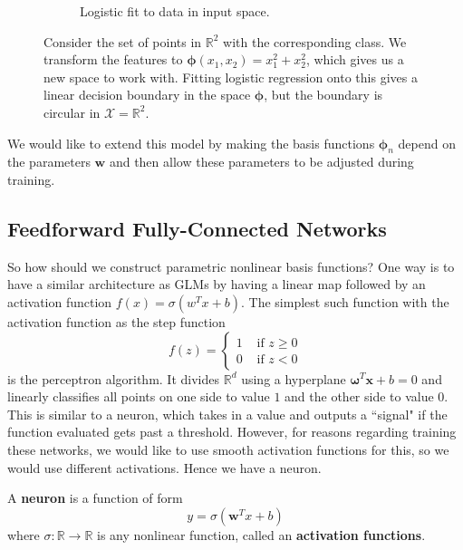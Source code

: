 \begin{figure}[H]
\begin{subfigure}[t]{0.24\textwidth}
      \caption{Logistic fit to data in input space.}
      \label{fig:raw_trained}
    \end{subfigure}
    \caption{Consider the set of points in $\mathbb{R}^2$ with the corresponding class. We transform the features to $\boldsymbol{\phi}(x_1, x_2) = x_1^2 + x_2^2$, which gives us a new space to work with. Fitting logistic regression onto this gives a linear decision boundary in the space $\boldsymbol{\phi}$, but the boundary is circular in $\mathcal{X} = \mathbb{R}^2$.}
    \label{fig:logistic_transformed}
  \end{figure}

  We would like to extend this model by making the basis functions $\boldsymbol{\phi}_n$ depend on the parameters $\mathbf{w}$ and then allow these parameters to be adjusted during training. 

\subsection{Feedforward Fully-Connected Networks}

  So how should we construct parametric nonlinear basis functions? One way is to have a similar architecture as GLMs by having a linear map followed by an activation function $f(x) = \sigma(w^T x + b)$. The simplest such function with the activation function as the step function 
  \begin{equation}
    f(z) = \begin{cases} 1 & \text{ if } z \geq 0 \\ 0 & \text{ if } z < 0 \end{cases}
  \end{equation}
  is the perceptron algorithm. It divides $\mathbb{R}^d$ using a hyperplane $\boldsymbol{\omega}^T \mathbf{x} + b = 0$ and linearly classifies all points on one side to value $1$ and the other side to value $0$. This is similar to a neuron, which takes in a value and outputs a ``signal" if the function evaluated gets past a threshold. However, for reasons regarding training these networks, we would like to use smooth activation functions for this, so we would use different activations. Hence we have a neuron. 

  \begin{definition}[Neuron]
    A \textbf{neuron} is a function of form 
    \begin{equation}
      y = \sigma(\mathbf{w}^T x  + b)
    \end{equation}
    where $\sigma: \mathbb{R} \rightarrow \mathbb{R}$ is any nonlinear function, called an \textbf{activation functions}. 
  \end{definition}
  

